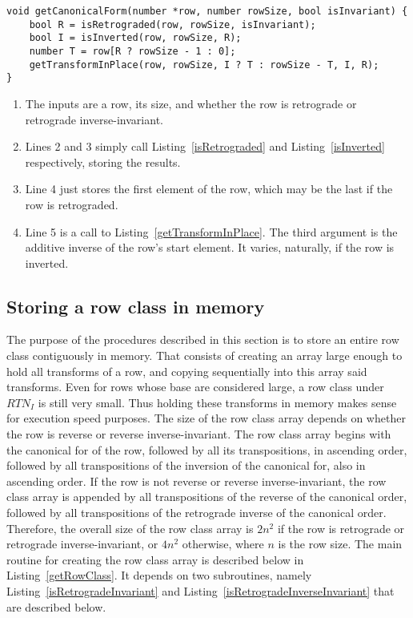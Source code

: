 \begin{lstlisting}[caption={Transforming a row into its canonical form.},label={getCanonicalForm}]
void getCanonicalForm(number *row, number rowSize, bool isInvariant) {
    bool R = isRetrograded(row, rowSize, isInvariant);
    bool I = isInverted(row, rowSize, R);
    number T = row[R ? rowSize - 1 : 0];
    getTransformInPlace(row, rowSize, I ? T : rowSize - T, I, R);
}
\end{lstlisting}

\begin{enumerate}
\item The inputs are a row, its size, and whether the row is retrograde or retrograde inverse-invariant.
\item Lines 2 and 3 simply call Listing~\ref{isRetrograded} and Listing~\ref{isInverted} respectively, storing the results.
\addtocounter{enumi}{1}
\item Line 4 just stores the first element of the row, which may be the last if the row is retrograded.
\item Line 5 is a call to Listing~\ref{getTransformInPlace}. The third argument is the additive inverse of the row's start element. It varies, naturally, if the row is inverted.
\end{enumerate}

\subsection{Storing a row class in memory}

The purpose of the procedures described in this section is to store an entire row class contiguously in memory. That consists of creating an array large enough to hold all transforms of a row, and copying sequentially into this array said transforms. Even for rows whose base are considered large, a row class under $RTN_I$ is still very small. Thus holding these transforms in memory makes sense for execution speed purposes. The size of the row class array depends on whether the row is reverse or reverse inverse-invariant. The row class array begins with the canonical for of the row, followed by all its transpositions, in ascending order, followed by all transpositions of the inversion of the canonical for, also in ascending order. If the row is not reverse or reverse inverse-invariant, the row class array is appended by all transpositions of the reverse of the canonical order, followed by all transpositions of the retrograde inverse of the canonical order. Therefore, the overall size of the row class array is $2n^2$ if the row is retrograde or retrograde inverse-invariant, or $4n^2$ otherwise, where $n$ is the row size. The main routine for creating the row class array is described below in Listing~\ref{getRowClass}. It depends on two subroutines, namely Listing~\ref{isRetrogradeInvariant} and Listing~\ref{isRetrogradeInverseInvariant} that are described below.

